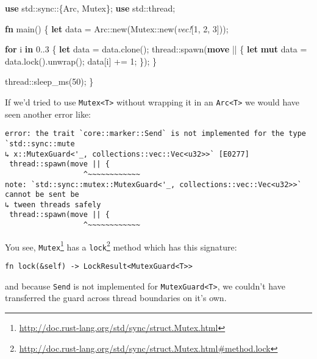 \documentclass[a4paper,]{book}
\newenvironment{Shaded}{\begin{snugshade}}{\end{snugshade}}
\newcommand{\KeywordTok}[1]{\textcolor[rgb]{0.13,0.29,0.53}{\textbf{{#1}}}}
\newcommand{\DecValTok}[1]{\textcolor[rgb]{0.00,0.00,0.81}{{#1}}}
\newcommand{\PreprocessorTok}[1]{\textcolor[rgb]{0.56,0.35,0.01}{\textit{{#1}}}}
\newcommand{\NormalTok}[1]{{#1}}
\renewcommand{\href}[2]{#2\footnote{\url{#1}}}
\begin{document}
\begin{Shaded}
\begin{Highlighting}[]
\KeywordTok{use} \NormalTok{std::sync::\{Arc, Mutex\};}
\KeywordTok{use} \NormalTok{std::thread;}

\KeywordTok{fn} \NormalTok{main() \{}
    \KeywordTok{let} \NormalTok{data = Arc::new(Mutex::new(}\PreprocessorTok{vec!}\NormalTok{[}\DecValTok{1}\NormalTok{, }\DecValTok{2}\NormalTok{, }\DecValTok{3}\NormalTok{]));}

    \KeywordTok{for} \NormalTok{i }\KeywordTok{in} \DecValTok{0.}\NormalTok{.}\DecValTok{3} \NormalTok{\{}
        \KeywordTok{let} \NormalTok{data = data.clone();}
        \NormalTok{thread::spawn(}\KeywordTok{move} \NormalTok{|| \{}
            \KeywordTok{let} \KeywordTok{mut} \NormalTok{data = data.lock().unwrap();}
            \NormalTok{data[i] += }\DecValTok{1}\NormalTok{;}
        \NormalTok{\});}
    \NormalTok{\}}

    \NormalTok{thread::sleep_ms(}\DecValTok{50}\NormalTok{);}
\NormalTok{\}}
\end{Highlighting}
\end{Shaded}

If we'd tried to use \texttt{Mutex\textless{}T\textgreater{}} without
wrapping it in an \texttt{Arc\textless{}T\textgreater{}} we would have
seen another error like:

\begin{verbatim}
error: the trait `core::marker::Send` is not implemented for the type `std::sync::mute
↳ x::MutexGuard<'_, collections::vec::Vec<u32>>` [E0277]
 thread::spawn(move || {
                  ^~~~~~~~~~~~~
note: `std::sync::mutex::MutexGuard<'_, collections::vec::Vec<u32>>` cannot be sent be
↳ tween threads safely
 thread::spawn(move || {
                  ^~~~~~~~~~~~~
\end{verbatim}

You see,
\href{http://doc.rust-lang.org/std/sync/struct.Mutex.html}{\texttt{Mutex}}
has a
\href{http://doc.rust-lang.org/std/sync/struct.Mutex.html\#method.lock}{\texttt{lock}}
method which has this signature:

\begin{verbatim}
fn lock(&self) -> LockResult<MutexGuard<T>>
\end{verbatim}

and because \texttt{Send} is not implemented for
\texttt{MutexGuard\textless{}T\textgreater{}}, we couldn't have
transferred the guard across thread boundaries on it's own.
\end{document}
